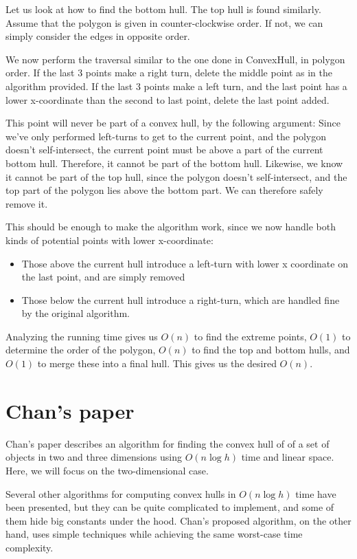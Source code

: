 \documentclass[11pt,a4paper]{article}
\begin{document}
Let us look at how to find the bottom hull. The top hull is found similarly. Assume that the polygon is given in counter-clockwise order. If not, we can simply consider the edges in opposite order.

We now perform the traversal similar to the one done in ConvexHull, in polygon order. If the last 3 points make a right turn, delete the middle point as in the algorithm provided. If the last 3 points make a left turn, and the last point has a lower x-coordinate than the second to last point, delete the last point added.

This point will never be part of a convex hull, by the following argument: Since we've only performed left-turns to get to the current point, and the polygon doesn't self-intersect, the current point must be above a part of the current bottom hull. Therefore, it cannot be part of the bottom hull. Likewise, we know it cannot be part of the top hull, since the polygon doesn't self-intersect, and the top part of the polygon lies above the bottom part. We can therefore safely remove it.

This should be enough to make the algorithm work, since we now handle both kinds of potential points with lower x-coordinate:

\begin{itemize}
    \item Those above the current hull introduce a left-turn with lower x coordinate on the last point, and are simply removed
    \item Those below the current hull introduce a right-turn, which are handled fine by the original algorithm.
\end{itemize}

Analyzing the running time gives us $O(n)$ to find the extreme points, $O(1)$ to determine the order of the polygon, $O(n)$ to find the top and bottom hulls, and $O(1)$ to merge these into a final hull. This gives us the desired $O(n)$.

\section{Chan's paper}

Chan's paper describes an algorithm for finding the convex hull of of
a set of objects in two and three dimensions using $O(n \log h)$ time and
linear space. Here, we will focus on the two-dimensional case.

Several other algorithms for computing convex hulls in $O(n \log h)$ time
have been presented, but they can be quite complicated to implement,
and some of them hide big constants under the hood. Chan's proposed
algorithm, on the other hand, uses simple techniques while achieving
the same worst-case time complexity.
\end{document}
